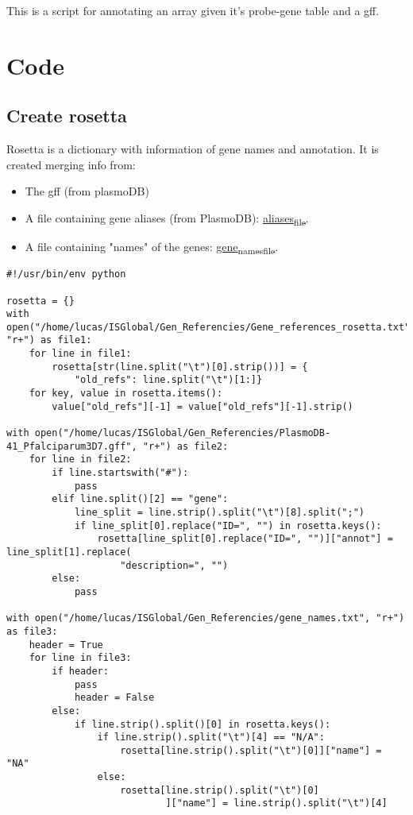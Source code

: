 \documentclass[11pt]{article}
\author{Lucas}
\date{\today}
\title{}
\begin{document}
\tableofcontents

This is a script for annotating an array given it's probe-gene table and a gff.

\section{Code}
\label{sec:org22ee9ee}
\subsection{Create rosetta}
\label{sec:org7068ac6}
Rosetta is a dictionary with information of gene names and annotation.
It is created merging info from:
\begin{itemize}
\item The gff (from plasmoDB)
\item A file containing gene aliases (from PlasmoDB): \href{file:///home/lucas/ISGlobal/Gen\_Referencies/Gene\_references\_rosetta.txt}{aliases\textsubscript{file}}.
\item A file containing "names" of the genes: \href{file:///home/lucas/ISGlobal/Gen\_Referencies/gene\_names.txt}{gene\textsubscript{names}\textsubscript{file}}.
\end{itemize}

\begin{verbatim}
#!/usr/bin/env python

rosetta = {}
with open("/home/lucas/ISGlobal/Gen_Referencies/Gene_references_rosetta.txt", "r+") as file1:
    for line in file1:
        rosetta[str(line.split("\t")[0].strip())] = {
            "old_refs": line.split("\t")[1:]}
    for key, value in rosetta.items():
        value["old_refs"][-1] = value["old_refs"][-1].strip()

with open("/home/lucas/ISGlobal/Gen_Referencies/PlasmoDB-41_Pfalciparum3D7.gff", "r+") as file2:
    for line in file2:
        if line.startswith("#"):
            pass
        elif line.split()[2] == "gene":
            line_split = line.strip().split("\t")[8].split(";")
            if line_split[0].replace("ID=", "") in rosetta.keys():
                rosetta[line_split[0].replace("ID=", "")]["annot"] = line_split[1].replace(
                    "description=", "")
        else:
            pass

with open("/home/lucas/ISGlobal/Gen_Referencies/gene_names.txt", "r+") as file3:
    header = True
    for line in file3:
        if header:
            pass
            header = False
        else:
            if line.strip().split()[0] in rosetta.keys():
                if line.strip().split("\t")[4] == "N/A":
                    rosetta[line.strip().split("\t")[0]]["name"] = "NA"
                else:
                    rosetta[line.strip().split("\t")[0]
                            ]["name"] = line.strip().split("\t")[4]


\end{verbatim}
\end{document}
